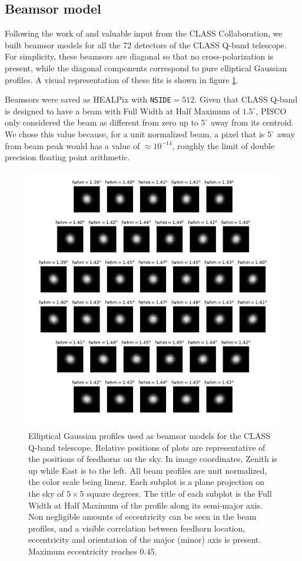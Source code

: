 \documentclass[a4paper,11pt]{article}
\begin{document}
\subsection{Beamsor model}

Following the work of \cite{2012SPIE.8452E..20E} and valuable input from the CLASS Collaboration, we built beamsor models for all the 72 detectors of the CLASS Q-band telescope. For simplicity, these beamsors are diagonal so that no cross-polarization is present, while the diagonal components correspond to pure elliptical Gaussian profiles. A visual representation of these fits is shown in figure \ref{fig::qbandbeamsmainbeamfwhmx}.

Beamsors were saved as HEALPix with \texttt{NSIDE}$=512$. Given that CLASS Q-band is designed to have a beam with Full Width at Half Maximum of $1.5^\circ$, PISCO only considered the beam as different from zero up to $5^\circ$ away from its centroid. We chose this value because, for a unit normalized beam, a pixel that is $5^\circ$ away from beam peak would has a value of $\approx 10^{-14}$, roughly the limit of double precision floating point arithmetic. 

\begin{figure}
	\centering
	\includegraphics[width=0.8 \linewidth]{figures/qband_beams_main_beam_fwhm_x}
	\caption{Elliptical Gaussian profiles used as beamsor models for the CLASS Q-band telescope. Relative positions of plots are representative of the positions of feedhorns on the sky. In image coordinates, Zenith is up while East is to the left. All beam profiles are unit normalized, the color scale being linear. Each subplot is a plane projection on the sky of $5\times5$ square degrees. The title of each subplot is the Full Width at Half Maximum of the profile along its semi-major axis. Non negligible amounts of eccentricity can be seen in the beam profiles, and a visible correlation between feedhorn location, eccentricity and orientation of the major (minor) axis is present. Maximum eccentricity reaches $0.45$.}
	\label{fig::qbandbeamsmainbeamfwhmx}
\end{figure}
\end{document}
